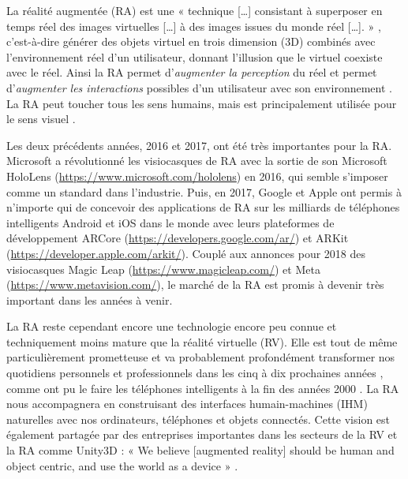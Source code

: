 La réalité augmentée (RA) est une « technique [\dots] consistant à superposer en temps réel des images virtuelles [\dots] à des images issues du monde réel [\dots]. » \citep{OQLFRA2017}, c'est-à-dire générer des objets virtuel en trois dimension (3D) combinés avec l'environnement réel d'un utilisateur, donnant l'illusion que le virtuel coexiste avec le réel. Ainsi la RA permet d'\emph{augmenter la perception} du réel et permet d'\emph{augmenter les interactions} possibles d'un utilisateur avec son environnement \citep{Azuma1997}. La RA peut toucher tous les sens humains, mais est principalement utilisée pour le sens visuel .


Les deux précédents années, 2016 et 2017, ont été très importantes pour la RA. Microsoft a révolutionné les visiocasques de RA avec la sortie de son Microsoft HoloLens (\url{https://www.microsoft.com/hololens}) en 2016, qui semble s'imposer comme un standard dans l'industrie. Puis, en 2017, Google et Apple ont permis à n'importe qui de concevoir des applications de RA sur les milliards de téléphones intelligents Android et iOS dans le monde avec leurs plateformes de développement ARCore (\url{https://developers.google.com/ar/}) et ARKit (\url{https://developer.apple.com/arkit/}). Couplé aux annonces pour 2018 des visiocasques Magic Leap (\url{https://www.magicleap.com/}) et Meta (\url{https://www.metavision.com/}), le marché de la RA est promis à devenir très important dans les années à venir.


La RA reste cependant encore une technologie encore peu connue et techniquement moins mature que la réalité virtuelle (RV). Elle est tout de même particulièrement prometteuse et va probablement profondément transformer nos quotidiens personnels et professionnels dans les cinq à dix prochaines années , comme ont pu le faire les téléphones intelligents à la fin des années 2000 \citep{Chaffey2018}. La RA nous accompagnera en construisant des interfaces humain-machines (IHM) naturelles avec nos ordinateurs, téléphones et objets connectés. Cette vision est également partagée par des entreprises importantes dans les secteurs de la RV et la RA comme Unity3D : « We believe [augmented reality] should be human and object centric, and use the world as a device » \citep{UnityFutureMRPartIII2017}.


